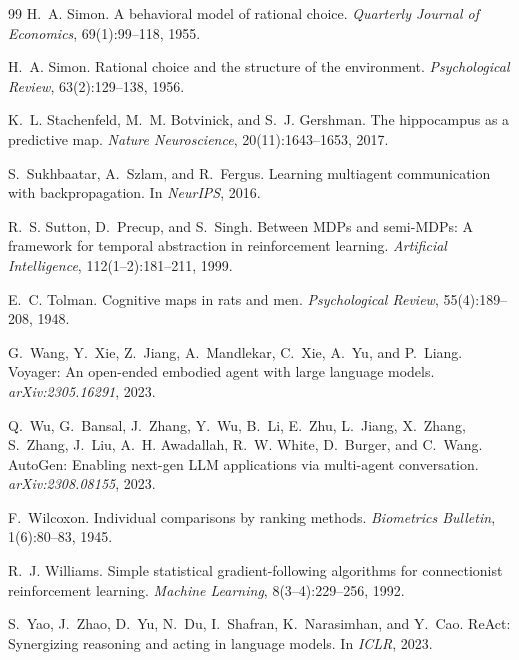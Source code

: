 \documentclass{article}
\begin{document}
\begin{thebibliography}{99}
H.~A. Simon.
\newblock A behavioral model of rational choice.
\newblock \emph{Quarterly Journal of Economics}, 69(1):99--118, 1955.

H.~A. Simon.
\newblock Rational choice and the structure of the environment.
\newblock \emph{Psychological Review}, 63(2):129--138, 1956.

K.~L. Stachenfeld, M.~M. Botvinick, and S.~J. Gershman.
\newblock The hippocampus as a predictive map.
\newblock \emph{Nature Neuroscience}, 20(11):1643--1653, 2017.

S.~Sukhbaatar, A.~Szlam, and R.~Fergus.
\newblock Learning multiagent communication with backpropagation.
\newblock In \emph{NeurIPS}, 2016.

R.~S. Sutton, D.~Precup, and S.~Singh.
\newblock Between MDPs and semi-MDPs: A framework for temporal abstraction in reinforcement learning.
\newblock \emph{Artificial Intelligence}, 112(1--2):181--211, 1999.

E.~C. Tolman.
\newblock Cognitive maps in rats and men.
\newblock \emph{Psychological Review}, 55(4):189--208, 1948.

G.~Wang, Y.~Xie, Z.~Jiang, A.~Mandlekar, C.~Xie, A.~Yu, and P.~Liang.
\newblock Voyager: An open-ended embodied agent with large language models.
\newblock \emph{arXiv:2305.16291}, 2023.

Q.~Wu, G.~Bansal, J.~Zhang, Y.~Wu, B.~Li, E.~Zhu, L.~Jiang, X.~Zhang, S.~Zhang, J.~Liu, A.~H. Awadallah, R.~W. White, D.~Burger, and C.~Wang.
\newblock AutoGen: Enabling next-gen LLM applications via multi-agent conversation.
\newblock \emph{arXiv:2308.08155}, 2023.

F.~Wilcoxon.
\newblock Individual comparisons by ranking methods.
\newblock \emph{Biometrics Bulletin}, 1(6):80--83, 1945.

R.~J. Williams.
\newblock Simple statistical gradient-following algorithms for connectionist reinforcement learning.
\newblock \emph{Machine Learning}, 8(3--4):229--256, 1992.

S.~Yao, J.~Zhao, D.~Yu, N.~Du, I.~Shafran, K.~Narasimhan, and Y.~Cao.
\newblock ReAct: Synergizing reasoning and acting in language models.
\newblock In \emph{ICLR}, 2023.


\end{thebibliography}
\end{document}
